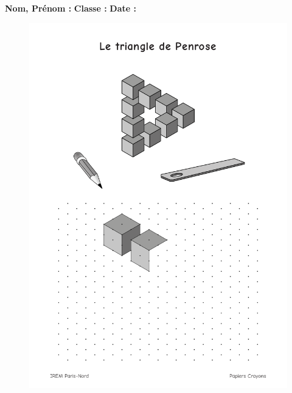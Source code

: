 



\textbf{Nom, Prénom :} \hspace{8cm} \textbf{Classe :} \hspace{3cm} \textbf{Date :}\\

\begin{figure}[H]
  \centering
  \includegraphics[width=0.8\linewidth]{5xDM/2-penrose.pdf}
\end{figure}

\newpage


